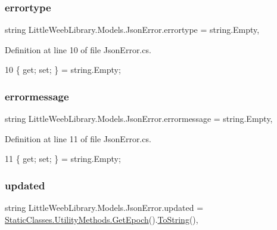 \subsubsection{\texorpdfstring{errortype}{errortype}}
{\footnotesize\ttfamily string Little\+Weeb\+Library.\+Models.\+Json\+Error.\+errortype = string.\+Empty\hspace{0.3cm}{\ttfamily [get]}, {\ttfamily [set]}}



Definition at line 10 of file Json\+Error.\+cs.


\begin{DoxyCode}
10 \{ \textcolor{keyword}{get}; \textcolor{keyword}{set}; \} = \textcolor{keywordtype}{string}.Empty;
\end{DoxyCode}
\mbox{\label{class_little_weeb_library_1_1_models_1_1_json_error_ac9cf92432e69f00b21e72d9f65f3d002}} 
\subsubsection{\texorpdfstring{errormessage}{errormessage}}
{\footnotesize\ttfamily string Little\+Weeb\+Library.\+Models.\+Json\+Error.\+errormessage = string.\+Empty\hspace{0.3cm}{\ttfamily [get]}, {\ttfamily [set]}}



Definition at line 11 of file Json\+Error.\+cs.


\begin{DoxyCode}
11 \{ \textcolor{keyword}{get}; \textcolor{keyword}{set}; \} = \textcolor{keywordtype}{string}.Empty;
\end{DoxyCode}
\mbox{\label{class_little_weeb_library_1_1_models_1_1_json_error_a31f1c85212ed62b97dc71b389e251cee}} 
\subsubsection{\texorpdfstring{updated}{updated}}
{\footnotesize\ttfamily string Little\+Weeb\+Library.\+Models.\+Json\+Error.\+updated = \mbox{\hyperlink{class_little_weeb_library_1_1_static_classes_1_1_utility_methods_a12336d9e64983ddabaad8950486fafb2}{Static\+Classes.\+Utility\+Methods.\+Get\+Epoch}}().\mbox{\hyperlink{class_little_weeb_library_1_1_models_1_1_json_error_ad7d5522c90119111d2e929f39e7f6d3c}{To\+String}}()\hspace{0.3cm}{\ttfamily [get]}, {\ttfamily [set]}}



